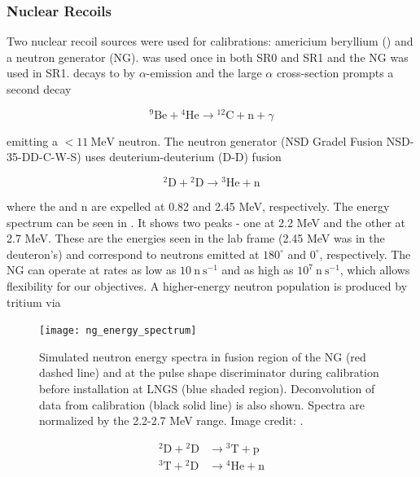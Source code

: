 \subsubsection{Nuclear Recoils}
\label{subsubsec:er_nr_calibrations_parameter_determ_nr}
Two nuclear recoil sources were used for calibrations: americium beryllium () and a neutron generator
(NG).  \ambe was used once in both SR0 and SR1 and the NG was used in SR1.  \ambe decays to  by $\alpha$-emission and
the large  $\alpha$ cross-section prompts a second decay

\begin{equation}
\mathrm{^{9}Be} + \mathrm{^{4}He} \rightarrow \mathrm{^{12}C + n} + \gamma
\end{equation}

\noindent emitting a $< 11\ \mathrm{MeV}$ neutron.  The neutron generator (NSD Gradel Fusion NSD-35-DD-C-W-S) uses
deuterium-deuterium (D-D) fusion

\begin{equation}
\mathrm{^{2}D} + \mathrm{^{2}D} \rightarrow \mathrm{^{3}He} + \mathrm{n}
\end{equation}

\noindent where the  and n are expelled at 0.82 and 2.45 MeV, respectively.  The energy spectrum can be seen in
.  It shows two peaks - one at 2.2 MeV and the other at 2.7 MeV.  These
are the energies seen in the lab frame (2.45 MeV was in the deuteron's) and correspond to neutrons emitted at $180^{\circ}$ and
$0^{\circ}$, respectively.  The NG can operate at rates as low as $10\ \mathrm{n\ s^{-1}}$
and as high as $10^7\ \mathrm{n\ s^{-1}}$, which allows flexibility for our objectives.  A higher-energy neutron
population is produced by tritium via

\begin{figure}
\centering
\texttt{[image: ng\_energy\_spectrum]}
\caption{Simulated neutron energy spectra in fusion region of the NG (red dashed line) and at the pulse shape discriminator during
calibration before installation at LNGS (blue shaded region).  Deconvolution of data from calibration (black solid line) is also
shown.  Spectra are normalized by the 2.2-2.7 MeV range.  Image credit: .}
\label{fig:er_nr_calibrations_parameter_determ_nr_ng_energy}
\end{figure}

\begin{subequations}
\begin{align}
\mathrm{^{2}D} + \mathrm{^{2}D} &\rightarrow \mathrm{^{3}T} + \mathrm{p} \\
\mathrm{^{3}T} + \mathrm{^{2}D} &\rightarrow \mathrm{^{4}He} + \mathrm{n}
\end{align}
\end{subequations}

